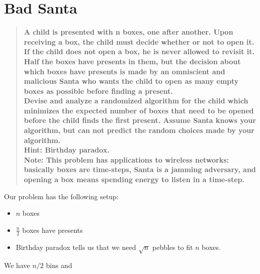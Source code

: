 \documentclass[titlepage]{article}\usepackage[]{graphicx}\usepackage[]{color}
\begin{document}
\section{Bad Santa }
\begin{quote}
	\textbf{
		A child is presented with n boxes, one after another. Upon receiving
		a box, the child must decide whether or not to open it. If the child does not
		open a box, he is never allowed to revisit it. Half the
		boxes have presents in them, but the decision about which boxes have presents
		is made by an omniscient and malicious Santa who wants the child to open as
		many empty boxes as possible before finding a present. \\ 
		Devise and analyze a randomized algorithm for the child which minimizes the
		expected number of boxes that need to be opened before the child finds the
		first present. Assume Santa knows your algorithm, but can not predict the
		random choices made by your algorithm. \\ 
		Hint: Birthday paradox. \\
		Note: This problem has applications to wireless networks: basically boxes are
		time-steps, Santa is a jamming adversary, and opening a box means spending
	energy to listen in a time-step.}
\end{quote}

Our problem has the following setup:

\begin{itemize}
	\item $n$ boxes
	\item $\frac{n}{2}$ boxes have presents
	\item Birthday paradox tells us that we need $\sqrt{n}$ pebbles to fit
		$n$ boxes. 
\end{itemize}

We have $n/2$ bins and 
\end{document}
